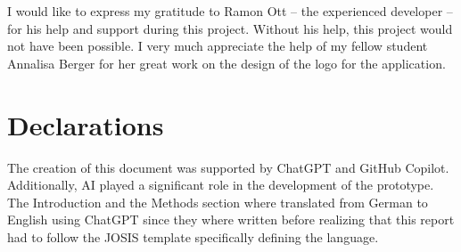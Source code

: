 \documentclass{josis}
\begin{document}
I would like to express my gratitude to Ramon Ott -- the experienced developer -- for his help and support during this project. 
Without his help, this project would not have been possible.
I very much appreciate the help of my fellow student Annalisa Berger for her great work on the design of the logo for the application.

\section*{Declarations}

The creation of this document was supported by ChatGPT and GitHub Copilot. 
Additionally, AI played a significant role in the development of the prototype.
The Introduction and the Methods section where translated from German to English using
ChatGPT since they where written before realizing that this report had to follow the JOSIS template
specifically defining the language.



\end{document}
